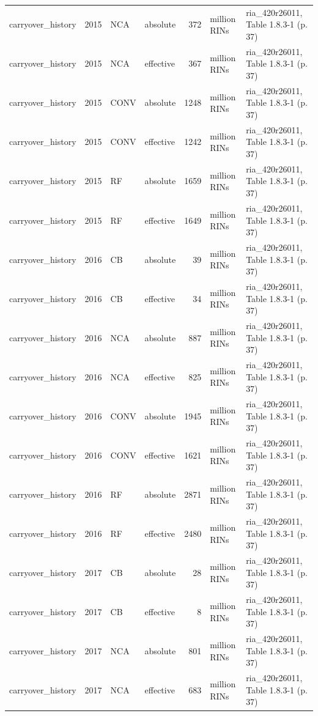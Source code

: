 \begin{longtable}{p{2.3cm}p{0.7cm}p{1.0cm}p{2.6cm}rp{1.7cm}p{4.6cm}}
carryover\_history & 2015 & NCA & absolute & 372 & million RINs & ria\_420r26011, Table 1.8.3-1 (p. 37) \\
carryover\_history & 2015 & NCA & effective & 367 & million RINs & ria\_420r26011, Table 1.8.3-1 (p. 37) \\
carryover\_history & 2015 & CONV & absolute & 1248 & million RINs & ria\_420r26011, Table 1.8.3-1 (p. 37) \\
carryover\_history & 2015 & CONV & effective & 1242 & million RINs & ria\_420r26011, Table 1.8.3-1 (p. 37) \\
carryover\_history & 2015 & RF & absolute & 1659 & million RINs & ria\_420r26011, Table 1.8.3-1 (p. 37) \\
carryover\_history & 2015 & RF & effective & 1649 & million RINs & ria\_420r26011, Table 1.8.3-1 (p. 37) \\
carryover\_history & 2016 & CB & absolute & 39 & million RINs & ria\_420r26011, Table 1.8.3-1 (p. 37) \\
carryover\_history & 2016 & CB & effective & 34 & million RINs & ria\_420r26011, Table 1.8.3-1 (p. 37) \\
carryover\_history & 2016 & NCA & absolute & 887 & million RINs & ria\_420r26011, Table 1.8.3-1 (p. 37) \\
carryover\_history & 2016 & NCA & effective & 825 & million RINs & ria\_420r26011, Table 1.8.3-1 (p. 37) \\
carryover\_history & 2016 & CONV & absolute & 1945 & million RINs & ria\_420r26011, Table 1.8.3-1 (p. 37) \\
carryover\_history & 2016 & CONV & effective & 1621 & million RINs & ria\_420r26011, Table 1.8.3-1 (p. 37) \\
carryover\_history & 2016 & RF & absolute & 2871 & million RINs & ria\_420r26011, Table 1.8.3-1 (p. 37) \\
carryover\_history & 2016 & RF & effective & 2480 & million RINs & ria\_420r26011, Table 1.8.3-1 (p. 37) \\
carryover\_history & 2017 & CB & absolute & 28 & million RINs & ria\_420r26011, Table 1.8.3-1 (p. 37) \\
carryover\_history & 2017 & CB & effective & 8 & million RINs & ria\_420r26011, Table 1.8.3-1 (p. 37) \\
carryover\_history & 2017 & NCA & absolute & 801 & million RINs & ria\_420r26011, Table 1.8.3-1 (p. 37) \\
carryover\_history & 2017 & NCA & effective & 683 & million RINs & ria\_420r26011, Table 1.8.3-1 (p. 37) \\

\end{longtable}
